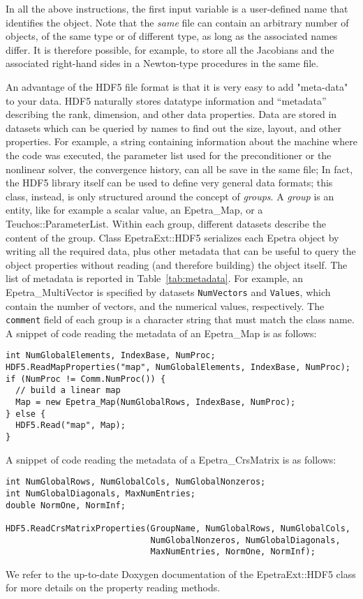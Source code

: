 \documentclass[11pt,relax]{SANDreport}
\begin{document}
In all the above instructions, the first input variable is a user-defined name
that identifies the object. Note that the {\sl same} file can contain an
arbitrary number of objects, of the same type or of different type, as long as
the associated names differ. It is therefore possible, for example, to store
all the Jacobians and the associated right-hand sides in a Newton-type
procedures in the same file.

An advantage of the HDF5 file format is that
it is very easy to add "meta-data" to your data.
HDF5 naturally stores
datatype information and ``metadata'' describing the rank, dimension, and
other data properties. Data are stored in datasets which can be queried by
names to find out the size, layout, and other properties.
For example, a string
containing information about the machine where the code was executed, the
parameter list used for the preconditioner or the nonlinear solver, the
convergence history, can all be save in the same file;
In fact, the HDF5 library itself can be used to define very general data
formats; this class, instead, is only structured around the concept of {\sl
  groups}.
A {\sl group}
is an entity, like for example a scalar value, an Epetra\_Map, or a
Teuchos::ParameterList. Within each group, different datasets describe the
content of the group. Class EpetraExt::HDF5 serializes each Epetra object by
writing all the required data, plus other metadata that can be useful to query
the object properties without reading (and therefore building) the object
itself. The list of metadata is reported in Table~\ref{tab:metadata}.
For example, an Epetra\_MultiVector is specified by
datasets {\tt NumVectors} and {\tt Values}, which contain the number of vectors, and
the numerical values, respectively. The {\tt comment} field of each group is a
character string that must match the class name. A snippet of code reading the
metadata of an Epetra\_Map is as follows:
\begin{verbatim}
int NumGlobalElements, IndexBase, NumProc;
HDF5.ReadMapProperties("map", NumGlobalElements, IndexBase, NumProc);
if (NumProc != Comm.NumProc()) {
  // build a linear map
  Map = new Epetra_Map(NumGlobalRows, IndexBase, NumProc);
} else {
  HDF5.Read("map", Map);
}
\end{verbatim}

A snippet of code reading the
metadata of a Epetra\_CrsMatrix is as follows:
\begin{verbatim}
int NumGlobalRows, NumGlobalCols, NumGlobalNonzeros;
int NumGlobalDiagonals, MaxNumEntries;
double NormOne, NormInf;

HDF5.ReadCrsMatrixProperties(GroupName, NumGlobalRows, NumGlobalCols,
                             NumGlobalNonzeros, NumGlobalDiagonals,
                             MaxNumEntries, NormOne, NormInf);
\end{verbatim}
We refer to the up-to-date Doxygen documentation of the EpetraExt::HDF5 class
for more details on the property reading methods.
\end{document}
